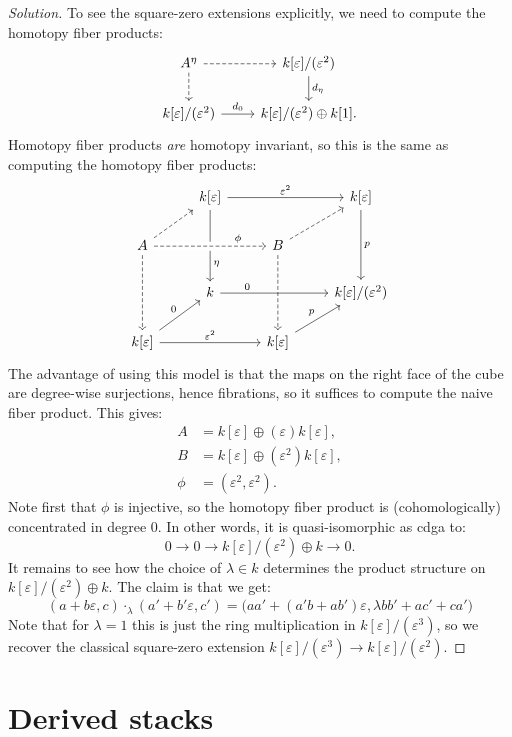 \documentclass[10pt,a4paper,reqno,oneside]{book} %
\theoremstyle{plain}
\theoremstyle{definition}
\theoremstyle{remark}
\numberwithin{equation}{section}
\begin{document}
\begin{proof}[Solution]
To see the square-zero extensions explicitly, we need to compute the homotopy fiber products:
\[
\begin{tikzcd}
A^{\eta}\arrow[dashed]{r}\arrow[dashed]{d} & k[\varepsilon]/(\varepsilon^2)\arrow{d}{d_{\eta}} \\
k[\varepsilon]/(\varepsilon^2) \arrow{r}{d_0} & k[\varepsilon]/(\varepsilon^2) \oplus k[1] .
\end{tikzcd}
\]
Homotopy fiber products \emph{are} homotopy invariant, so this is the same as computing the homotopy fiber products:
\[
\begin{tikzcd}
&
k[\varepsilon]
\ar{rr}{\varepsilon^2}
\ar[]{dd}[near end]{\eta}
& & k[\varepsilon]
\ar{dd}{p}
\\
A
\ar[crossing over,dashed]{rr}[near end]{\phi}
\ar[swap,dashed]{dd}
\ar[dashed]{ur}
& & B \ar[dashed]{ur}\ar[dashed]{dd}
\\
&
k
\ar[near start]{rr}{0}
& & k[\varepsilon]/(\varepsilon^2)
\\
k[\varepsilon]
\ar{rr}{\varepsilon^2}
\ar{ur}{0}
& & k[\varepsilon]
\ar{ur}{p}
\end{tikzcd}
\]
The advantage of using this model is that the maps on the right face of the cube are degree-wise surjections, hence fibrations,
so it suffices to compute the naive fiber product. This gives:
\begin{align*}
A &= k[\varepsilon] \oplus (\varepsilon) k[\varepsilon], \\
B &=  k[\varepsilon] \oplus  (\varepsilon^2) k[\varepsilon], \\
\phi &= (\varepsilon^2, \varepsilon^2).
\end{align*}
Note first that $\phi$ is injective, so the homotopy fiber product is (cohomologically) concentrated in degree 0. In other words,
it is quasi-isomorphic as cdga to:
\[	0 \to 0 \to k[\varepsilon]/(\varepsilon^2) \oplus k \to 0.	\]
It remains to see how the choice of $\lambda \in k$ determines the product structure on $k[\varepsilon]/(\varepsilon^2) \oplus k$.
The claim is that we get:
\[	(a + b \varepsilon, c) \cdot_{\lambda} (a' + b' \varepsilon, c') = 
\big(aa' + (a'b + ab')\varepsilon, \lambda bb' + ac' + ca' \big)	\]
Note that for $\lambda = 1$ this is just the ring multiplication in $k[\varepsilon]/(\varepsilon^3)$, so we recover the
classical square-zero extension $k[\varepsilon]/(\varepsilon^3) \to k[\varepsilon]/(\varepsilon^2)$.
\end{proof}
\fi

\chapter{Derived stacks}





\end{document}
